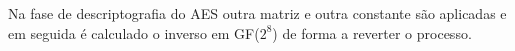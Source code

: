 Na fase de descriptografia do AES outra matriz e outra constante são aplicadas e em seguida é calculado o inverso em GF($2^8$) de forma a reverter o processo.








